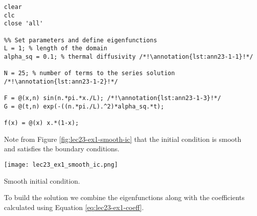 \begin{lstlisting}[name=lec23_ex1, style=myMatlab]
clear
clc
close 'all'

%% Set parameters and define eigenfunctions
L = 1; % length of the domain
alpha_sq = 0.1; % thermal diffusivity /*!\annotation{lst:ann23-1-1}!*/

N = 25; % number of terms to the series solution /*!\annotation{lst:ann23-1-2}!*/

F = @(x,n) sin(n.*pi.*x./L); /*!\annotation{lst:ann23-1-3}!*/
G = @(t,n) exp(-((n.*pi./L).^2)*alpha_sq.*t);

f(x) = @(x) x.*(1-x);

\end{lstlisting}
Note from Figure \ref{fig:lec23-ex1-smooth-ic} that the initial condition is smooth and satisfies the boundary conditions.
\begin{marginfigure}
\texttt{[image: lec23\_ex1\_smooth\_ic.png]}
\caption{Smooth initial condition.}
\label{fig:lec23-ex1-smooth-ic}
\end{marginfigure}

To build the solution we combine the eigenfunctions along with the coefficients calculated using Equation \ref{eq:lec23-ex1-coeff}.

